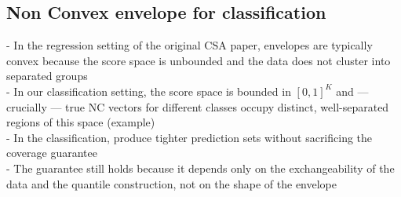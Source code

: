 \subsection{Non Convex envelope for classification}
- In the regression setting of the original CSA paper, envelopes are typically convex because the score space is unbounded and the data does not cluster into separated groups\\
- In our classification setting, the score space is bounded in $[0,1]^K$ and — crucially — true NC vectors for different classes occupy distinct, well-separated regions of this space (example)\\
- In the classification, 
produce tighter prediction sets without sacrificing the coverage guarantee\\
- The guarantee still holds because it depends only on the exchangeability of the data and the quantile construction, not on the shape of the envelope
